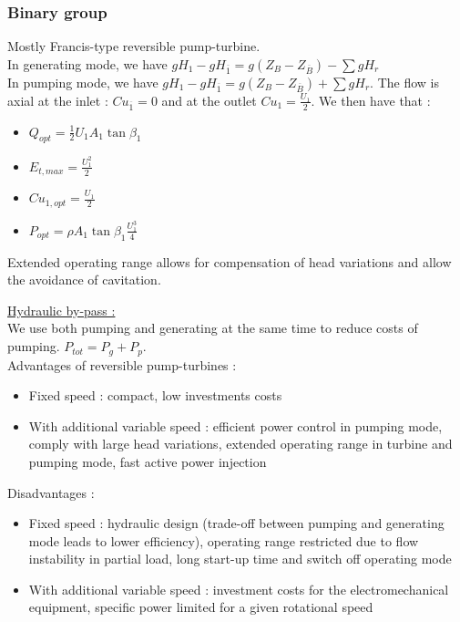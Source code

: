 \documentclass[../main.tex]{subfiles}
\begin{document}
\subsubsection{Binary group}
Mostly Francis-type reversible pump-turbine.\\
In generating mode, we have $gH_1 - g H_{\overline{1}} = g(Z_B - Z_{\overline{B}}) - \sum g H_r$\\
In pumping mode, we have $gH_1 - g H_{\overline{1}} = g(Z_B - Z_{\overline{B}}) + \sum g H_r$. The flow is axial at the inlet : $Cu_{\overline{1}} = 0$ and at the outlet $Cu_1 = \frac{U_1}{2}$. We then have that : \begin{itemize}
    \item $Q_{opt} = \frac{1}{2} U_1 A_1 \tan \beta_1$
    \item $E_{t,max} = \frac{U_1^2}{2} $
    \item $Cu_{1,opt} = \frac{U_1}{2}$
    \item $P_{opt} = \rho A_1 \tan \beta_1 \frac{U_1^3}{4}$
\end{itemize}

Extended operating range allows for compensation of head variations and allow the avoidance of cavitation. 


\quad \underline{Hydraulic by-pass :}\\
We use both pumping and generating at the same time to reduce costs of pumping. $P_{tot} = P_g + P_p$.\\

Advantages of reversible pump-turbines : \begin{itemize}
    \item Fixed speed : compact, low investments costs
    \item With additional variable speed : efficient power control in pumping mode, comply with large head variations, extended operating range in turbine and pumping mode, fast active power injection
\end{itemize}

Disadvantages : \begin{itemize}
    \item Fixed speed : hydraulic design (trade-off between pumping and generating mode leads to lower efficiency), operating range restricted due to flow instability in partial load, long start-up time and switch off operating mode
    \item With additional variable speed : investment costs for the electromechanical equipment, specific power limited for a given rotational speed
\end{itemize}
\end{document}
